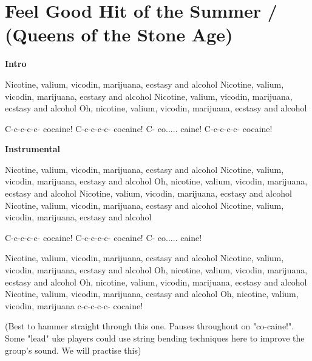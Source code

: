 \section{Feel Good Hit of the Summer / (Queens of the Stone Age)}\label{sec:feel_good_hit_of_the_summer}

\textbf{Intro}

Nicotine, valium, vicodin, marijuana, ecstasy and alcohol
Nicotine, valium, vicodin, marijuana, ecstasy and alcohol
Nicotine, valium, vicodin, marijuana, ecstasy and alcohol
Oh, nicotine, valium, vicodin, marijuana, ecstasy and
alcohol

                            
C-c-c-c-c- cocaine!
                            
C-c-c-c-c- cocaine!
                            
C- co.....       caine!
                            
C-c-c-c-c- cocaine!


\textbf{Instrumental}

Nicotine, valium, vicodin, marijuana, ecstasy and alcohol
Nicotine, valium, vicodin, marijuana, ecstasy and alcohol
Oh, nicotine, valium, vicodin, marijuana, ecstasy and
alcohol
Nicotine, valium, vicodin, marijuana, ecstasy and alcohol
Nicotine, valium, vicodin, marijuana, ecstasy and alcohol
Nicotine, valium, vicodin, marijuana, ecstasy and alcohol

                            
C-c-c-c-c- cocaine!
                            
C-c-c-c-c- cocaine!
                            
C- co.....       caine!

Nicotine, valium, vicodin, marijuana, ecstasy and alcohol
Nicotine, valium, vicodin, marijuana, ecstasy and alcohol
Oh, nicotine, valium, vicodin, marijuana, ecstasy and
alcohol
Oh, nicotine, valium, vicodin, marijuana, ecstasy and
alcohol
Nicotine, valium, vicodin, marijuana, ecstasy and alcohol
Oh, nicotine, valium, vicodin, marijuana c-c-c-c-c- cocaine!

{\small (Best to hammer straight through this one. Pauses throughout on
"co-caine!". Some "lead" uke players could use string
bending techniques here to improve the group's sound. We will practise this)}
